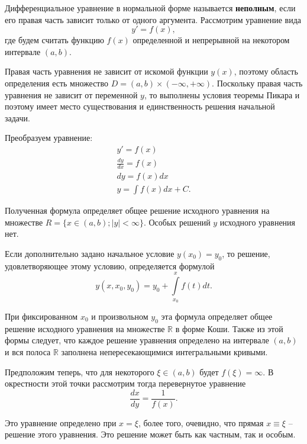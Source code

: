 \documentclass[a5paper, 11pt]{extbook}
\theoremstyle{definition}
\theoremstyle{definition}
\begin{document}
Дифференциальное уравнение в нормальной форме называется \textbf{неполным}, если его правая часть зависит только от одного аргумента. Рассмотрим уравнение вида
\begin{equation}
    y' = f(x),
\end{equation}
где будем считать функцию \(f(x)\) определенной и непрерывной на некотором интервале \((a, b)\).

Правая часть уравнения не зависит от искомой функции \(y(x)\), поэтому область определения есть множество \(D = (a, b) \times (-\infty, +\infty)\). Поскольку правая часть уравнения не зависит от переменной \(y\), то выполнены условия теоремы Пикара и поэтому имеет место существования и единственность решения начальной задачи.

Преобразуем уравнение:
\begin{gather}
    y' = f(x) \\
    \frac{dy}{dx} = f(x) \\
    dy = f(x)dx \\
    y = \int f(x)dx + C.
\end{gather}

Полученная формула определяет общее решение исходного уравнения на множестве \(R = \{ x \in (a, b); |y| < \infty \}\). Особых решений \(y\) исходного уравнения нет.

Если дополнительно задано начальное условие \(y(x_0) = y_0\),  то решение, удовлетворяющее этому условию, определяется формулой
\begin{equation}
    y(x, x_0, y_0) = y_0 + \int\limits_{x_0}^x f(t)dt.
\end{equation}

При фиксированном \(x_0\) и произвольном \(y_0\) эта формула определяет общее решение исходного уравнения на множестве \(\mathbb{R}\) в форме Коши. Также из этой формы следует, что каждое решение уравнения определено на интервале \((a, b)\) и вся полоса \(\mathbb{R}\) заполнена непересекающимися интегральными кривыми.

Предположим теперь, что для некоторого \(\xi \in (a, b)\) будет \(f(\xi) = \infty\). В окрестности этой точки рассмотрим тогда перевернутое уравнение
\begin{equation}
    \frac{dx}{dy} = \frac{1}{f(x)}.
\end{equation}

Это уравнение определено при \(x = \xi\), более того, очевидно, что прямая \(x \equiv \xi\) -- решение этого уравнения. Это решение может быть как частным, так и особым.
\end{document}
